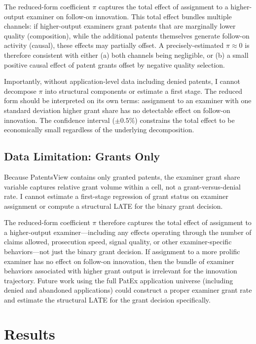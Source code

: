 \documentclass[12pt]{article}
\begin{document}
The reduced-form coefficient $\pi$ captures the total effect of assignment to a higher-output examiner on follow-on innovation. This total effect bundles multiple channels: if higher-output examiners grant patents that are marginally lower quality (composition), while the additional patents themselves generate follow-on activity (causal), these effects may partially offset. A precisely-estimated $\pi \approx 0$ is therefore consistent with either (a) both channels being negligible, or (b) a small positive causal effect of patent grants offset by negative quality selection.

Importantly, without application-level data including denied patents, I cannot decompose $\pi$ into structural components or estimate a first stage. The reduced form should be interpreted on its own terms: assignment to an examiner with one standard deviation higher grant share has no detectable effect on follow-on innovation. The confidence interval ($\pm 0.5\%$) constrains the total effect to be economically small regardless of the underlying decomposition.

\subsection{Data Limitation: Grants Only}

Because PatentsView contains only granted patents, the examiner grant share variable captures relative grant volume within a cell, not a grant-versus-denial rate. I cannot estimate a first-stage regression of grant status on examiner assignment or compute a structural LATE for the binary grant decision.

The reduced-form coefficient $\pi$ therefore captures the total effect of assignment to a higher-output examiner---including any effects operating through the number of claims allowed, prosecution speed, signal quality, or other examiner-specific behaviors---not just the binary grant decision. If assignment to a more prolific examiner has no effect on follow-on innovation, then the bundle of examiner behaviors associated with higher grant output is irrelevant for the innovation trajectory. Future work using the full PatEx application universe (including denied and abandoned applications) could construct a proper examiner grant rate and estimate the structural LATE for the grant decision specifically.


\section{Results}
\end{document}
